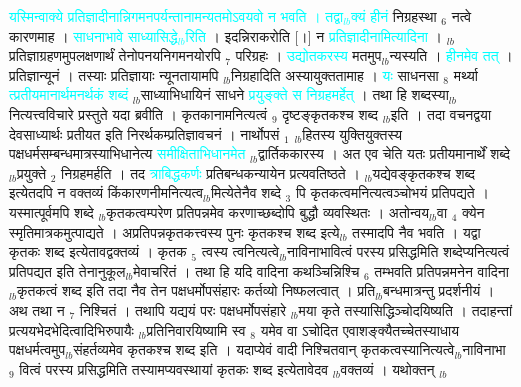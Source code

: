 \documentclass[article,12pt,a4paper]{memoir}%
\newcommand{\quotelemma}[1]{\textcolor{cyan}{#1}}
\begin{document}
	  
	  \pstart \leavevmode%
	\hphantom{.}\quotelemma{यस्मिन्वाक्ये प्रतिज्ञादीनान्निगमनपर्यन्तानामन्यतमोऽवयवो न भवति । तद्वा{\tiny $_{lb}$}क्यं हीनं} \cite[15b3]{vn-msN} निग्रहस्था {\tiny $_{6}$} नत्वे कारणमाह । \quotelemma{साधनाभावे साध्यासिद्धे{\tiny $_{lb}$}रिति} \cite[15b3]{vn-msN} । इदन्निराकरोति [।] न \quotelemma{प्रतिज्ञादीनामित्यादिना} \cite[15b3]{vn-msN} । {\tiny $_{lb}$}प्रतिज्ञाग्रहणमुपलक्षणार्थं तेनोपनयनिगमनयोरपि {\tiny $_{7}$} परिग्रहः । \quotelemma{उद्योतकरस्य} मतमुप{\tiny $_{lb}$}न्यस्यति । \quotelemma{हीनमेव तत्} \cite[15b3]{vn-msN} । प्रतिज्ञान्यूनं । तस्याः प्रतिज्ञायाः न्यूनतायामपि {\tiny $_{lb}$}निग्रहादिति अस्यायुक्ततामाह । \quotelemma{यः} साधनसा {\tiny $_{8}$} मर्थ्या \quotelemma{त्प्रतीयमानार्थमनर्थकं शब्दं} {\tiny $_{lb}$}साध्याभिधायिनं साधने \quotelemma{प्रयुङ्क्ते स निग्रहमर्हेत्} \cite[15b4]{vn-msN} । तथा हि शब्दस्या{\tiny $_{lb}$}नित्यत्त्वविचारे प्रस्तुते यदा ब्रवीति । कृतकानामनित्यत्वं {\tiny $_{9}$} \leavevmode{} दृष्टङ्कृतकश्च शब्द {\tiny $_{lb}$}इति । तदा वचनद्वया देवसाध्यार्थः प्रतीयत इति निरर्थकम्प्रतिज्ञावचनं । नार्थोपसं {\tiny $_{1}$} {\tiny $_{lb}$}हितस्य युक्तियुक्तस्य पक्षधर्मसम्बन्धमात्रस्याभिधानेत्य \quotelemma{समीक्षिताभिधानमेत} \cite[15b4]{vn-msN} {\tiny $_{lb}$}द्वार्तिककारस्य । अत एव चेति \cite[15b4]{vn-msN} यतः प्रतीयमानार्थें शब्दे {\tiny $_{lb}$}प्रयुक्ते {\tiny $_{2}$} निग्रहमर्हति । तद \quotelemma{त्राबिद्धकर्णः} प्रतिबन्धकन्यायेन प्रत्यवतिष्ठते । {\tiny $_{lb}$}यद्येवङ्कृतकश्च शब्द इत्येतदपि न वक्तव्यं किंकारणनीमनित्यत्व{\tiny $_{lb}$}मित्येतेनैव शब्दे {\tiny $_{3}$} पि कृतकत्वमनित्यत्वञ्चोभयं प्रतिपद्यते । यस्मात्पूर्वमपि शब्दे {\tiny $_{lb}$}कृतकत्वम्परेण प्रतिपन्नमेव करणाच्छब्दोपि बुद्धौ व्यवस्थितः । अतोन्वय{\tiny $_{lb}$}वा {\tiny $_{4}$} क्येन स्मृतिमात्रकमुत्पाद्यते । अप्रतिपन्नकृतकत्त्वस्य पुनः कृतकश्च शब्द इत्ये{\tiny $_{lb}$} \leavevmode{} तस्मादपि नैव भवति । यद्वा कृतकः शब्द इत्येतावद्वक्तव्यं । कृतक {\tiny $_{5}$} त्वस्य त्वनित्यत्वे{\tiny $_{lb}$}नाविनाभावित्वं परस्य प्रसिद्धमिति शब्देप्यनित्यत्वं प्रतिपद्यत इति तेनानुकूल{\tiny $_{lb}$}मेवाचरितं । तथा हि यदि वादिना कथञ्चिन्निश्चि {\tiny $_{6}$} तम्भवति प्रतिपन्नमनेन वादिना {\tiny $_{lb}$}कृतकत्वं शब्द इति तदा नैव तेन पक्षधर्मोपसंहारः कर्तव्यो निष्फलत्वात् । प्रति{\tiny $_{lb}$}बन्धमात्रन्तु प्रदर्शनीयं । अथ तथा न {\tiny $_{7}$} निश्चितं । तथापि यद्ययं परः पक्षधर्मोपसंहारे {\tiny $_{lb}$}मया कृते तस्यासिद्धिञ्चोदयिष्यति । तदाहन्तां प्रत्ययभेदभेदित्वादिभिरुपायैः {\tiny $_{lb}$}प्रतिनिवारयिष्यामि स्व {\tiny $_{8}$} यमेव वा ऽचोदित एवाशङ्क्यैतच्चेतस्याधाय पक्षधर्मत्वमुप{\tiny $_{lb}$}संहर्तव्यमेव कृतकश्च शब्द इति । यदाप्येवं वादी निश्चितवान् कृतकत्वस्यानित्यत्वे{\tiny $_{lb}$}नाविनाभा {\tiny $_{9}$} \leavevmode{} वित्वं परस्य प्रसिद्धमिति तस्यामप्यवस्थायां कृतकः शब्द इत्येतावेदव {\tiny $_{lb}$}वक्तव्यं । यथोक्तन् {\tiny $_{lb}$} 
\end{document}
